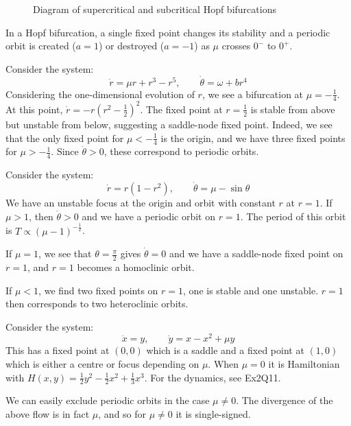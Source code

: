 \documentclass[../Main.tex]{subfiles}
\begin{document}
\begin{figure}
    \centering
    \caption{Diagram of supercritical and subcritical Hopf bifurcations}
    \label{figHopf}
\end{figure}

In a Hopf bifurcation, a single fixed point changes its stability and a periodic orbit is created ($a = 1$) or destroyed ($a = -1$) as $\mu$ crosses $0^-$ to $0^+$.
\begin{example}
    Consider the system:
    \begin{equation*}
        \dot{r} = \mu r + r^3 - r^5, \qquad \dot \theta = \omega + br^4
    \end{equation*}
    Considering the one-dimensional evolution of $r$, we see a bifurcation at $\mu = -\frac14$. At this point, $\dot{r} = -r\left(r^2 - \frac12\right)^2$. The fixed point at $r = \frac12$ is stable from above but unstable from below, suggesting a saddle-node fixed point. Indeed, we see that the only fixed point for $\mu < -\frac14$ is the origin, and we have three fixed points for $\mu > -\frac14$. Since $\dot\theta > 0$, these correspond to periodic orbits.
\end{example}
\begin{example}
    Consider the system:
    \begin{equation*}
        \dot{r} = r(1-r^2),\qquad \dot{\theta} = \mu - \sin\theta
    \end{equation*}   
    We have an unstable focus at the origin and orbit with constant $r$ at $r = 1$. If $\mu > 1$, then $\dot{\theta} > 0$ and we have a periodic orbit on $r = 1$. The period of this orbit is $T \propto (\mu - 1)^{-\frac12}$.

    If $\mu = 1$, we see that $\theta = \frac\pi2$ gives $\dot\theta = 0$ and we have a saddle-node fixed point on $r = 1$, and $r = 1$ becomes a homoclinic orbit.

    If $\mu < 1$, we find two fixed points on $r = 1$, one is stable and one unstable. $r = 1$ then corresponds to two heteroclinic orbits.
\end{example}
\begin{example} %
    Consider the system:
    \begin{equation*}
        \dot{x} = y,\qquad \dot{y} = x-x^2 + \mu y
    \end{equation*}
    This has a fixed point at $(0, 0)$ which is a saddle and a fixed point at $(1, 0)$ which is either a centre or focus depending on $\mu$. When $\mu = 0$ it is Hamiltonian with $H(x, y) = \frac12 y^2 - \frac12x^2 + \frac13 x^3$. For the dynamics, see Ex2Q11.

    We can easily exclude periodic orbits in the case $\mu \neq 0$. The divergence of the above flow is in fact $\mu$, and so for $\mu \neq 0$ it is single-signed.
\end{example}
\end{document}
